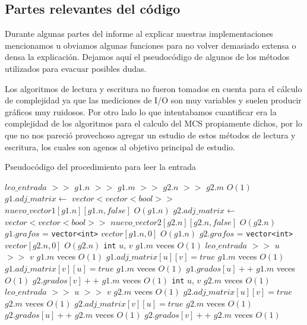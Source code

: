 \newpage
\subsection{Partes relevantes del código}
\lstset{language=C++, breaklines=true, basicstyle=\footnotesize}
\lstset{numbers=left, numberstyle=\tiny, stepnumber=1, numbersep=5pt, tabsize=2}

Durante algunas partes del informe al explicar nuestras implementaciones mencionamos u obviamos algunas funciones para no volver demasiado extensa o densa la explicación. Dejamos aquí el pseudocódigo de algunos de los métodos utilizados para evacuar posibles dudas.

Los algoritmos de lectura y escritura no fueron tomados en cuenta para el cálculo de complejidad ya que las mediciones de I/O son muy variables y suelen producir gráficos muy ruidosos. Por otro lado lo que intentabamos cuantificar era la complejidad de los algoritmos para el calculo del MCS propiamente dichos, por lo que no nos pareció provechoso agregar un estudio de estos métodos de lectura y escritura, los cuales son agenos al objetivo principal de estudio.

\begin{algorithm}[H]
  \begin{algorithmic}[1]
  \caption{Pseudocódigo del procedimiento para leer la entrada}
  \label{algo:ap-2}
    \State $leo\_entrada$ $>>$ $g1.n$ $>>$ $g1.m$ $>>$ $g2.n$ $>>$ $g2.m$
    \Comment $O(1)$
    	\State $g1.adj\_matrix \gets$ \texttt{$vector<vector<bool>>$} $nuevo\_vector1[g1.n][g1.n,false]$
    \Comment $O(g1.n)$
    	\State $g2.adj\_matrix \gets$ \texttt{$vector<vector<bool>>$} $nuevo\_vector2[g2.n][g2.n,false]$
    \Comment $O(g2.n)$
    \State $g1.grafos$ = \texttt{vector<int>} $vector[g1.n,0]$
    \Comment $O(g1.n)$
    \State $g2.grafos$ = \texttt{vector<int>} $vector[g2.n,0]$
    \Comment $O(g2.n)$
         \State \texttt{int} $u$, $v$
		 \Comment $g1.m$ veces $O(1)$ 
         \State $leo\_entrada$ $>>$ $u$ $>>$ $v$
		 \Comment $g1.m$ veces $O(1)$ 
		 \State $g1.adj\_matrix[u][v] = true$
		 \Comment $g1.m$ veces $O(1)$ 		 
		 \State $g1.adj\_matrix[v][u] = true$
		 \Comment $g1.m$ veces $O(1)$ 
		 \State $g1.grados[u]++$
		 \Comment $g1.m$ veces $O(1)$ 
		 \State $g2.grados[v]++$
		 \Comment $g1.m$ veces $O(1)$ 
    \EndFor
         \State \texttt{int} $u$, $v$
		 \Comment $g2.m$ veces $O(1)$ 
         \State $leo\_entrada$ $>>$ $u$ $>>$ $v$
		 \Comment $g2.m$ veces $O(1)$ 
		 \State $g2.adj\_matrix[u][v] = true$
		 \Comment $g2.m$ veces $O(1)$ 
		 \State $g2.adj\_matrix[v][u] = true$
		 \Comment $g2.m$ veces $O(1)$ 
		 \State $g2.grados[u]++$
		 \Comment $g2.m$ veces $O(1)$ 
		 \State $g2.grados[v]++$
		 \Comment $g2.m$ veces $O(1)$ 
    \EndFor
		\EndProcedure
	\end{algorithmic}
\end{algorithm}


